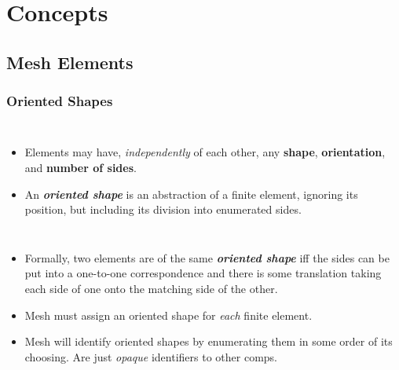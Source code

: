 \documentclass[compress]{beamer}
\begin{document}
\section{Concepts}

\subsection{Mesh Elements}

\begin{frame}
  \frametitle{Oriented Shapes}
  \begin{columns}
      \pause
      \begin{itemize}[<+->]
        \item Elements may have, \emph{independently} of each other, any \textbf{shape}, \textbf{orientation}, and \textbf{number of sides}.
        \item An \textbf{\emph{oriented shape}} is an abstraction of a finite element, ignoring its position, but including its division into
          enumerated sides.
      \end{itemize}
  \end{columns}
  
  \begin{itemize}[<+->]
    \item Formally, two elements are of the same \textbf{\emph{oriented shape}} iff the sides can be put into a one-to-one correspondence and
       there is some translation taking each side of one onto the matching side of the other.
    \item Mesh must assign an oriented shape for \emph{each} finite element. 
    \item Mesh will identify oriented shapes by enumerating them in some order of its choosing. Are just \emph{opaque} identifiers to other comps.
  \end{itemize}
\end{frame}
\end{document}

